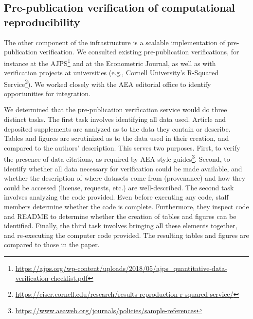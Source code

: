 \documentclass[PP]{AEA}
\newcommand{\urlcite}[2]{#2\footnote{\url{#1}}}
\begin{document}
\FloatBarrier

\subsection{Pre-publication verification of computational reproducibility}
\label{sec:verification}
The other component of the infrastructure is a scalable implementation of pre-publication verification. We consulted existing pre-publication verifications, for instance at the \urlcite{https://ajps.org/wp-content/uploads/2018/05/ajps_quantitative-data-verification-checklist.pdf}{\ac{AJPS}} and at the Econometric Journal, as well as with verification projects at universities (e.g., Cornell University's \urlcite{https://ciser.cornell.edu/research/results-reproduction-r-squared-service/}{R-Squared Service}). We worked closely with the AEA editorial office to identify opportunities for integration. 

We determined that the pre-publication verification service would do three distinct tasks. The first task involves identifying all data used.  Article and deposited supplements are analyzed as to the data they contain or describe. Tables and figures are scrutinized as to the data used in their creation, and compared to the authors' description. This serves two purposes. First, to verify the presence of data citations, as required by \urlcite{https://www.aeaweb.org/journals/policies/sample-references}{AEA style guides}. Second, to identify whether all data necessary for verification could be made available, and whether the description of where datasets come from (provenance) and how they could be accessed (license, requests, etc.) are well-described. The second task involves analyzing the code provided. Even before executing any code, staff members determine whether the code is complete. Furthermore, they inspect code and README to determine whether the creation of tables and figures can be identified. Finally, the third task  involves bringing all these elements together, and re-executing the computer code provided. The resulting tables and figures are compared to those in the paper. 
\end{document}
